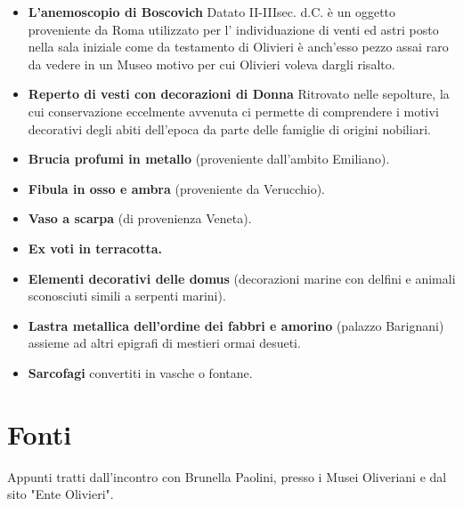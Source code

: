 \documentclass[hidelinks,12pt,a4paper]{article}
\begin{document}
\begin{flushleft}
\begin{itemize}
			\item \textbf{L'anemoscopio di Boscovich} 
			Datato II-IIIsec. d.C. è un oggetto proveniente da Roma utilizzato per l’ individuazione di venti ed astri posto nella sala iniziale come da testamento di Olivieri è anch'esso pezzo assai raro da vedere in un Museo motivo per cui Olivieri voleva dargli risalto.
			\item \textbf{Reperto di vesti con decorazioni di Donna} 
			Ritrovato nelle sepolture, la cui conservazione eccelmente avvenuta ci permette di comprendere i motivi decorativi degli abiti dell'epoca da parte delle famiglie di origini nobiliari.
			\item \textbf{Brucia profumi in metallo} (proveniente dall'ambito Emiliano).
			\item \textbf{Fibula in osso e ambra} (proveniente da Verucchio).
			\item \textbf{Vaso a scarpa} (di provenienza Veneta).
			\item \textbf{Ex voti in terracotta.}
			\item \textbf{Elementi decorativi delle domus} (decorazioni marine con delfini e animali sconosciuti simili a serpenti marini).
			\item \textbf{Lastra metallica dell'ordine dei fabbri e amorino} (palazzo Barignani) assieme ad altri epigrafi di mestieri ormai desueti.
			\item \textbf{Sarcofagi} convertiti in vasche o fontane.
		\end{itemize}
		
		\section{Fonti}
		Appunti tratti dall'incontro con Brunella Paolini, presso i Musei Oliveriani e dal sito "Ente Olivieri".\\
		
		
	
		\vspace*{\fill}
		\doclicenseThis
	\end{flushleft}
    
\end{document}
